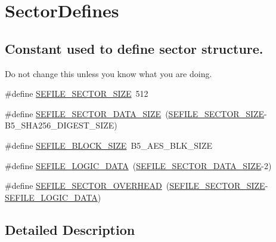 \hypertarget{group___sector_defines}{\section{Sector\-Defines}
\label{group___sector_defines}
}
\subsection*{Constant used to define sector structure.}
\label{_amgrp878a4016ba8d9172160307f2a4efbb65}%
Do not change this unless you know what you are doing. \begin{DoxyCompactItemize}
\item 
\#define \hyperlink{group___sector_defines_gad205a758c315675de3ad9f5f1cbf962d}{S\-E\-F\-I\-L\-E\-\_\-\-S\-E\-C\-T\-O\-R\-\_\-\-S\-I\-Z\-E}~512
\item 
\#define \hyperlink{group___sector_defines_ga6961ed45e472749b587136d18eb74b4d}{S\-E\-F\-I\-L\-E\-\_\-\-S\-E\-C\-T\-O\-R\-\_\-\-D\-A\-T\-A\-\_\-\-S\-I\-Z\-E}~(\hyperlink{group___sector_defines_gad205a758c315675de3ad9f5f1cbf962d}{S\-E\-F\-I\-L\-E\-\_\-\-S\-E\-C\-T\-O\-R\-\_\-\-S\-I\-Z\-E}-\/B5\-\_\-\-S\-H\-A256\-\_\-\-D\-I\-G\-E\-S\-T\-\_\-\-S\-I\-Z\-E)
\item 
\#define \hyperlink{group___sector_defines_ga9344350dc20df5bbdc5693775c54afcb}{S\-E\-F\-I\-L\-E\-\_\-\-B\-L\-O\-C\-K\-\_\-\-S\-I\-Z\-E}~B5\-\_\-\-A\-E\-S\-\_\-\-B\-L\-K\-\_\-\-S\-I\-Z\-E
\item 
\#define \hyperlink{group___sector_defines_ga460525481b728a7bbad706019c7f2156}{S\-E\-F\-I\-L\-E\-\_\-\-L\-O\-G\-I\-C\-\_\-\-D\-A\-T\-A}~(\hyperlink{group___sector_defines_ga6961ed45e472749b587136d18eb74b4d}{S\-E\-F\-I\-L\-E\-\_\-\-S\-E\-C\-T\-O\-R\-\_\-\-D\-A\-T\-A\-\_\-\-S\-I\-Z\-E}-\/2)
\item 
\#define \hyperlink{group___sector_defines_ga70a387176632325441aebca4839e19fc}{S\-E\-F\-I\-L\-E\-\_\-\-S\-E\-C\-T\-O\-R\-\_\-\-O\-V\-E\-R\-H\-E\-A\-D}~(\hyperlink{group___sector_defines_gad205a758c315675de3ad9f5f1cbf962d}{S\-E\-F\-I\-L\-E\-\_\-\-S\-E\-C\-T\-O\-R\-\_\-\-S\-I\-Z\-E}-\/\hyperlink{group___sector_defines_ga460525481b728a7bbad706019c7f2156}{S\-E\-F\-I\-L\-E\-\_\-\-L\-O\-G\-I\-C\-\_\-\-D\-A\-T\-A})
\end{DoxyCompactItemize}


\subsection{Detailed Description}



